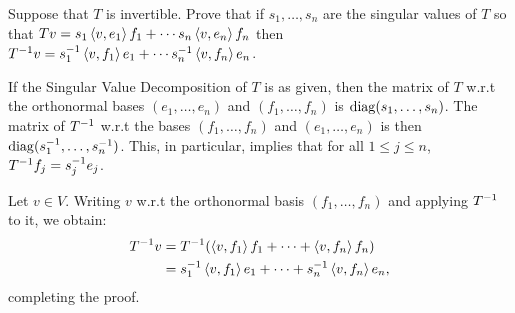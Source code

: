 \begin{exercise}
Suppose that $T$ is invertible. Prove that if $s_1, \ldots, s_n$ are the singular
values of $T$ so that
$T v = s_1 \left \langle v, e_1 \right \rangle f_1 + \cdots s_n \left \langle v, e_n \right \rangle f_n$ then
$T^{-1} v = s_1^{-1} \left \langle v, f_1 \right \rangle e_1 + \cdots s_n^{-1} \left \langle v, f_n \right \rangle e_n$.
\end{exercise}
\begin{solution}
If the Singular Value Decomposition of $T$ is as given, then the matrix of $T$ w.r.t
the orthonormal bases $(e_1, \ldots, e_n)$ and $(f_1, \ldots, f_n)$ is $\operatorname{diag}(s_1, \ldots, s_n)$.
The matrix of $T^{-1}$ w.r.t the bases $(f_1, \ldots, f_n)$ and $(e_1, \ldots, e_n)$ is
then $\operatorname{diag}(s_1^{-1}, \ldots, s_n^{-1})$. This, in particular, implies that
for all $1 \leq j \leq n$, $T^{-1} f_j = s_j^{-1} e_j$.

Let $v \in V$. Writing $v$ w.r.t the orthonormal basis $(f_1, \ldots, f_n)$ and applying
$T^{-1}$ to it, we obtain:
\begin{align*}
    T^{-1} v & = T^{-1} (\left \langle v, f_1 \right \rangle f_1 + \cdots + \left \langle v, f_n \right \rangle f_n) \\
              & = s_1^{-1} \left \langle v, f_1 \right \rangle e_1 + \cdots + s_n^{-1} \left \langle v, f_n \right \rangle e_n,
\end{align*}
completing the proof.
\end{solution}





















